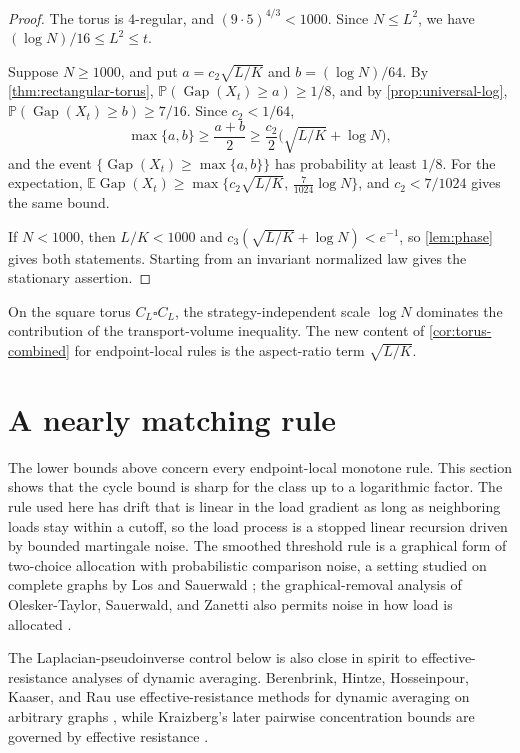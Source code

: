 \documentclass[11pt]{article}
\theoremstyle{remark}
\newcommand{\E}{\mathbb{E}}
\newcommand{\Pp}{\mathbb{P}}
\newcommand{\Gap}{\operatorname{Gap}}
\begin{document}
\begin{proof}
The torus is $4$-regular, and $(9\cdot5)^{4/3}<1000$. Since $N\le L^2$, we have $(\log N)/16\le L^2\le t$.

Suppose $N\ge1000$, and put $a=c_2\sqrt{L/K}$ and $b=(\log N)/64$. By \cref{thm:rectangular-torus}, $\Pp(\Gap(X_t)\ge a)\ge1/8$, and by \cref{prop:universal-log}, $\Pp(\Gap(X_t)\ge b)\ge7/16$. Since $c_2<1/64$,
\[
 \max\{a,b\}\ge\frac{a+b}2\ge\frac{c_2}2\bigl(\sqrt{L/K}+\log N\bigr),
\]
and the event $\{\Gap(X_t)\ge\max\{a,b\}\}$ has probability at least $1/8$. For the expectation, $\E\Gap(X_t)\ge\max\{c_2\sqrt{L/K},\,\tfrac{7}{1024}\log N\}$, and $c_2<7/1024$ gives the same bound.

If $N<1000$, then $L/K<1000$ and $c_3(\sqrt{L/K}+\log N)<e^{-1}$, so \cref{lem:phase} gives both statements. Starting from an invariant normalized law gives the stationary assertion.
\end{proof}

On the square torus $C_L\square C_L$, the strategy-independent scale $\log N$ dominates the contribution of the transport-volume inequality. The new content of \cref{cor:torus-combined} for endpoint-local rules is the aspect-ratio term $\sqrt{L/K}$.

\section{A nearly matching rule}\label{sec:smoothed}

The lower bounds above concern every endpoint-local monotone rule. This section shows that the cycle bound is sharp for the class up to a logarithmic factor. The rule used here has drift that is linear in the load gradient as long as neighboring loads stay within a cutoff, so the load process is a stopped linear recursion driven by bounded martingale noise. The smoothed threshold rule is a graphical form of two-choice allocation with probabilistic comparison noise, a setting studied on complete graphs by Los and Sauerwald \cite{LosSauerwald2023}; the graphical-removal analysis of Olesker-Taylor, Sauerwald, and Zanetti also permits noise in how load is allocated \cite{OleskerTaylorSauerwaldZanetti2026}.

The Laplacian-pseudoinverse control below is also close in spirit to effective-resistance analyses of dynamic averaging. Berenbrink, Hintze, Hosseinpour, Kaaser, and Rau use effective-resistance methods for dynamic averaging on arbitrary graphs \cite{BerenbrinkEtAl2023}, while Kraizberg's later pairwise concentration bounds are governed by effective resistance \cite{Kraizberg2026}.
\end{document}

